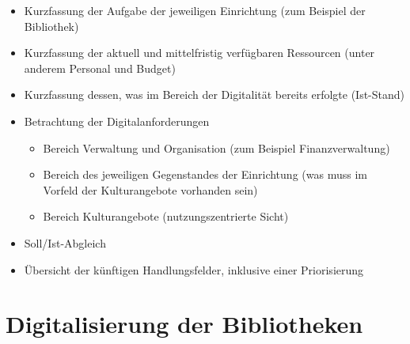 \documentclass[a4paper,
fontsize=11pt,
oneside,
numbers=noperiodatend,
parskip=half-,
bibliography=totoc,
final
]{scrartcl}
\begin{document}
\begin{itemize}
\item
  Kurzfassung der Aufgabe der jeweiligen Einrichtung (zum Beispiel der
  Bibliothek)
\item
  Kurzfassung der aktuell und mittelfristig verfügbaren Ressourcen
  (unter anderem Personal und Budget)
\item
  Kurzfassung dessen, was im Bereich der Digitalität bereits erfolgte
  (Ist-Stand)
\item
  Betrachtung der Digitalanforderungen

  \begin{itemize}
  \item
    Bereich Verwaltung und Organisation (zum Beispiel Finanzverwaltung)
  \item
    Bereich des jeweiligen Gegenstandes der Einrichtung (was muss im
    Vorfeld der Kulturangebote vorhanden sein)
  \item
    Bereich Kulturangebote (nutzungszentrierte Sicht)
  \end{itemize}
\item
  Soll/Ist-Abgleich
\item
  Übersicht der künftigen Handlungsfelder, inklusive einer Priorisierung
\end{itemize}

\section{Digitalisierung der
Bibliotheken}\label{digitalisierung-der-bibliotheken}
\end{document}
